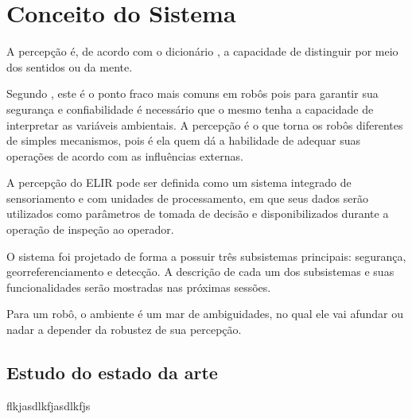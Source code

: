 \chapter{Conceito do Sistema}
\label{chap:concep}
A percepção é, de acordo com o dicionário , a capacidade de distinguir por meio dos sentidos ou da mente.

Segundo , este é o ponto fraco mais comuns em robôs pois para garantir sua segurança e confiabilidade é necessário que o mesmo tenha a capacidade de interpretar as variáveis ambientais. A percepção é o que torna os robôs diferentes de simples mecanismos, pois é ela quem dá a habilidade de adequar suas operações de acordo com as influências externas.

A percepção do ELIR pode ser definida como um sistema integrado de sensoriamento e com unidades de processamento, em que seus dados serão utilizados como parâmetros de tomada de decisão e disponibilizados durante a operação de inspeção ao operador.

O sistema foi projetado de forma a possuir três subsistemas principais: segurança, georreferenciamento e detecção. A descrição de cada um dos subsistemas e suas funcionalidades serão mostradas nas próximas sessões.

\begin{flushright}
   \begin{list}{}{
      \setlength{\leftmargin}{4.5cm}
      \setlength{\rightmargin}{0cm}
      \setlength{\labelwidth}{0pt}
      \setlength{\labelsep}{\leftmargin}}
      \item Para um robô, o ambiente é um mar de ambiguidades, no qual ele vai afundar ou nadar a depender da robustez de sua percepção.


      \begin{list}{}{
      \setlength{\leftmargin}{0cm}
      \setlength{\rightmargin}{0cm}
      \setlength{\labelwidth}{0pt}
      \setlength{\labelsep}{\leftmargin}}
      \item \cite{Fitzpatrick}
      \end{list}
   \end{list}
\end{flushright}

\section{Estudo do estado da arte}
\label{sec:sota}
flkjasdlkfjasdlkfjs

